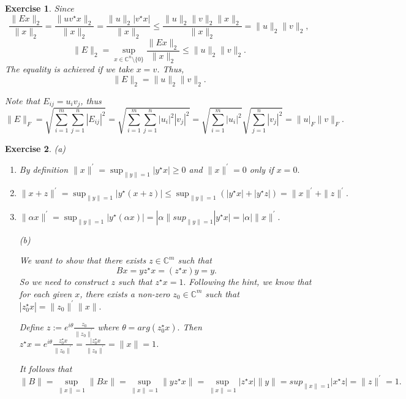 \documentclass[paper=a4, fontsize=11pt]{scrartcl} %
\numberwithin{equation}{section} %
\numberwithin{figure}{section} %
\numberwithin{table}{section} %
\newtheorem{exercise}{Exercise}
\numberwithin{exercise}{section}
\begin{document}
\begin{exercise}
Since
$$ \frac{ \|Ex\|_{2}}{\|x\|_{2}}=\frac{\|uv^{\star} x\|_{2}}{\|x\|_{2}}= \frac{ \|u\|_2   |v^{\star}x|}{\|x\|_2} \leq \frac{ \|u\|_2  \|v\|_{2}\|x\|_{2}}{\|x\|_2}=\|u\|_2\|v\|_2 ,$$
$$\|E\|_2=\sup_{x\in\mathbb{C}^n\setminus \{0\}}\frac{ \|Ex\|_{2}}{\|x\|_{2}}\leq \|u\|_2\|v\|_2.$$
The equality is achieved if we take $x=v$. Thus,
$$\|E\|_2=\|u\|_2\|v\|_2.$$

Note that $E_{ij}=u_i v_j$, thus
$$\|E\|_{F}=\sqrt{\sum_{i=1}^m\sum_{j=1}^n |E_{ij}|^2 }=\sqrt{\sum_{i=1}^m\sum_{j=1}^n |u_i|^2 |v_j|^2}=\sqrt{\sum_{i=1}^m |u_i|^2}\sqrt{\sum_{j=1}^n |v_j|^2}=\|u|_{F}\|v\|_{F}.$$
\end{exercise}

\begin{exercise}

(a)
\begin{enumerate}
\item By definition $\|x\|^{'}=\sup_{\|y\|=1}|y^{\star}x|\geq 0$ and $\|x\|^{'}=0$ only if  $x=0.$
\item  $\|x+z\|^{'} =\sup_{\|y\|=1}|y^{\star}(x+z)|\leq\sup_{\|y\|=1}(|y^{\star}x| +|y^{\star}z|)=\|x\|^{'}+\|z\|^{'}.$
\item $\|\alpha x\|^{'}=\sup_{\|y\|=1}|y^{\star}(\alpha x)|=|\alpha\|sup_{\|y\|=1}|y^{\star} x|=|\alpha|\|x\|^{'}.$

(b)

We want to show that there exists $z\in\mathbb{C}^m$ such that $$Bx=yz^{\star} x=(z^{\star} x) y=y.$$ So we need to construct $z$ such that $z^\star x=1.$
Following the hint, we know that for each given $x$, there exists a non-zero $z_0\in\mathbb{C}^m$ such that $|z_{0}^{\star} x|=\|z_{0}\|^{'}\|x\|.$

Define $z:=e^{i\theta}\frac{z_0}{\|z_0\|^{'}}$ where $\theta=arg(z_{0}^\star x).$
Then $z^{\star} x= e^{i\theta}\frac{z_0^{\star} x}{\|z_0\|^{'}}=\frac{|z_{0}^{\star} x}{\|z_0\|^{'}}=\|x\|=1$.

It follows that 
$$\|B\|=\sup_{\|x\|=1} \|Bx\|=\sup_{\|x\|=1} \|yz^{\star}x\|=\sup_{\|x\|=1}|z^{\star}x| \|y\|=sup_{\|x\|=1}|x^{\star} z|=\|z\|^{'}=1.$$

\end{enumerate}
\end{exercise}
\end{document}
